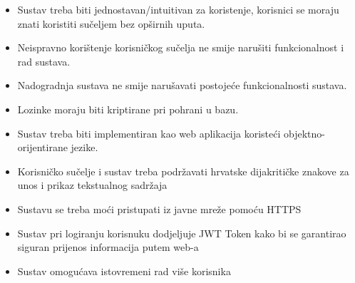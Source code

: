 			   \begin{itemize}
                \item Sustav treba biti jednostavan/intuitivan za koristenje, korisnici se moraju znati koristiti sučeljem bez opširnih uputa.
                \item Neispravno korištenje korisničkog sučelja ne smije narušiti funkcionalnost i rad sustava.
                \item Nadogradnja sustava ne smije narušavati postojeće funkcionalnosti sustava.
                \item Lozinke moraju biti kriptirane pri pohrani u bazu.
                \item Sustav treba biti implementiran kao web aplikacija koristeći objektno-\newline orijentirane jezike.
                \item Korisničko sučelje i sustav treba podržavati hrvatske dijakritičke znakove za unos i prikaz tekstualnog sadržaja
                \item Sustavu se treba moći pristupati iz javne mreže pomoću HTTPS
                \item Sustav pri logiranju korisnuku dodjeljuje JWT Token kako bi se garantirao siguran prijenos informacija putem web-a
                \item Sustav omogućava istovremeni rad više korisnika

            \end{itemize}
			 
			 
	